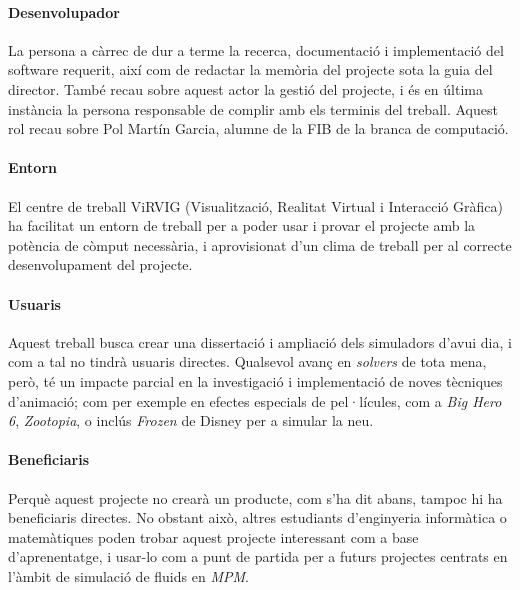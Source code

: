 \documentclass[a4paper]{article} %
\begin{document}
	\paragraph{\quad Desenvolupador} La persona a càrrec de dur a terme la recerca, documentació i implementació del software requerit, així com de redactar la memòria del projecte sota la guia del director. També recau sobre aquest actor la gestió del projecte, i és en última instància la persona responsable de complir amb els terminis del treball. Aquest rol recau sobre Pol Martín Garcia, alumne de la FIB de la branca de computació.
	\paragraph{\quad Entorn} El centre de treball ViRVIG (Visualització, Realitat Virtual i Interacció Gràfica) ha facilitat un entorn de treball per a poder usar i provar el projecte amb la potència de còmput necessària, i aprovisionat d'un clima de treball per al correcte desenvolupament del projecte.
	\paragraph{\quad Usuaris} Aquest treball busca crear una dissertació i ampliació dels simuladors d'avui dia, i com a tal no tindrà usuaris directes. Qualsevol avanç en \textit{solvers} de tota mena, però, té un impacte parcial en la investigació i implementació de noves tècniques d'animació; com per exemple en efectes especials de pel·lícules, com a \textit{Big Hero 6}, \textit{Zootopia}, o inclús \textit{Frozen} de Disney \cite{Stomakhin} per a simular la neu.
	\paragraph{\quad Beneficiaris} Perquè aquest projecte no crearà un producte, com s'ha dit abans, tampoc hi ha beneficiaris directes. No obstant això, altres estudiants d'enginyeria informàtica o matemàtiques poden trobar aquest projecte interessant com a base d'aprenentatge, i usar-lo com a punt de partida per a futurs projectes centrats en l'àmbit de simulació de fluids en \textit{MPM}.
	
\end{document}
